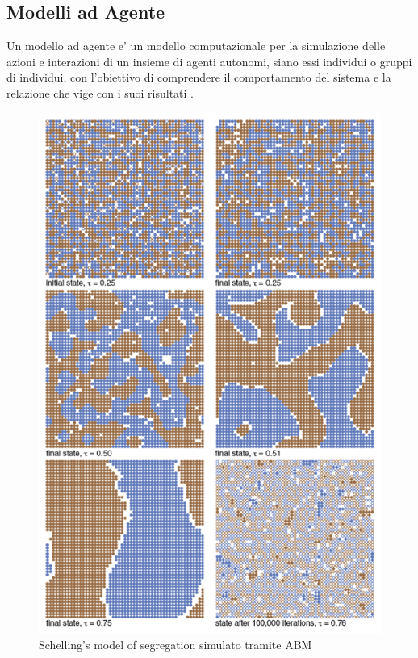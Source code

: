 \subsection{Modelli ad Agente}
Un modello ad agente e' un modello computazionale per la simulazione delle 
azioni e interazioni di un insieme di agenti autonomi, siano essi individui
o gruppi di individui, con l'obiettivo di comprendere il comportamento 
del sistema e la relazione che vige con i suoi risultati \cite{wiki:Agent-based_model}
\cite{7822080}.

\begin{figure}[h]
    \begin{center}
        \includegraphics[scale=0.5]{img/201381146479794-2013-09HayesF1png.png}
        \caption{Schelling's model of segregation simulato tramite ABM}
        \label{fig:schelling_segregation_abm}
    \end{center}
\end{figure}


